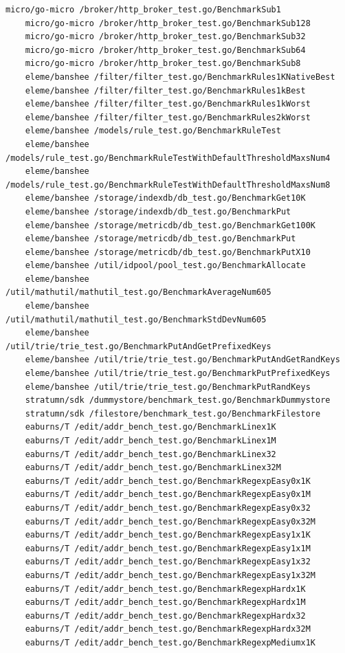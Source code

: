 \documentclass{seal_thesis}
\begin{document}
\begin{lstlisting}[basicstyle=\tiny]
	micro/go-micro /broker/http_broker_test.go/BenchmarkSub1
	micro/go-micro /broker/http_broker_test.go/BenchmarkSub128
	micro/go-micro /broker/http_broker_test.go/BenchmarkSub32
	micro/go-micro /broker/http_broker_test.go/BenchmarkSub64
	micro/go-micro /broker/http_broker_test.go/BenchmarkSub8
	eleme/banshee /filter/filter_test.go/BenchmarkRules1KNativeBest
	eleme/banshee /filter/filter_test.go/BenchmarkRules1kBest
	eleme/banshee /filter/filter_test.go/BenchmarkRules1kWorst
	eleme/banshee /filter/filter_test.go/BenchmarkRules2kWorst
	eleme/banshee /models/rule_test.go/BenchmarkRuleTest
	eleme/banshee /models/rule_test.go/BenchmarkRuleTestWithDefaultThresholdMaxsNum4
	eleme/banshee /models/rule_test.go/BenchmarkRuleTestWithDefaultThresholdMaxsNum8
	eleme/banshee /storage/indexdb/db_test.go/BenchmarkGet10K
	eleme/banshee /storage/indexdb/db_test.go/BenchmarkPut
	eleme/banshee /storage/metricdb/db_test.go/BenchmarkGet100K
	eleme/banshee /storage/metricdb/db_test.go/BenchmarkPut
	eleme/banshee /storage/metricdb/db_test.go/BenchmarkPutX10
	eleme/banshee /util/idpool/pool_test.go/BenchmarkAllocate
	eleme/banshee /util/mathutil/mathutil_test.go/BenchmarkAverageNum605
	eleme/banshee /util/mathutil/mathutil_test.go/BenchmarkStdDevNum605
	eleme/banshee /util/trie/trie_test.go/BenchmarkPutAndGetPrefixedKeys
	eleme/banshee /util/trie/trie_test.go/BenchmarkPutAndGetRandKeys
	eleme/banshee /util/trie/trie_test.go/BenchmarkPutPrefixedKeys
	eleme/banshee /util/trie/trie_test.go/BenchmarkPutRandKeys
	stratumn/sdk /dummystore/benchmark_test.go/BenchmarkDummystore
	stratumn/sdk /filestore/benchmark_test.go/BenchmarkFilestore
	eaburns/T /edit/addr_bench_test.go/BenchmarkLinex1K
	eaburns/T /edit/addr_bench_test.go/BenchmarkLinex1M
	eaburns/T /edit/addr_bench_test.go/BenchmarkLinex32
	eaburns/T /edit/addr_bench_test.go/BenchmarkLinex32M
	eaburns/T /edit/addr_bench_test.go/BenchmarkRegexpEasy0x1K
	eaburns/T /edit/addr_bench_test.go/BenchmarkRegexpEasy0x1M
	eaburns/T /edit/addr_bench_test.go/BenchmarkRegexpEasy0x32
	eaburns/T /edit/addr_bench_test.go/BenchmarkRegexpEasy0x32M
	eaburns/T /edit/addr_bench_test.go/BenchmarkRegexpEasy1x1K
	eaburns/T /edit/addr_bench_test.go/BenchmarkRegexpEasy1x1M
	eaburns/T /edit/addr_bench_test.go/BenchmarkRegexpEasy1x32
	eaburns/T /edit/addr_bench_test.go/BenchmarkRegexpEasy1x32M
	eaburns/T /edit/addr_bench_test.go/BenchmarkRegexpHardx1K
	eaburns/T /edit/addr_bench_test.go/BenchmarkRegexpHardx1M
	eaburns/T /edit/addr_bench_test.go/BenchmarkRegexpHardx32
	eaburns/T /edit/addr_bench_test.go/BenchmarkRegexpHardx32M
	eaburns/T /edit/addr_bench_test.go/BenchmarkRegexpMediumx1K

\end{lstlisting}
\end{document}
